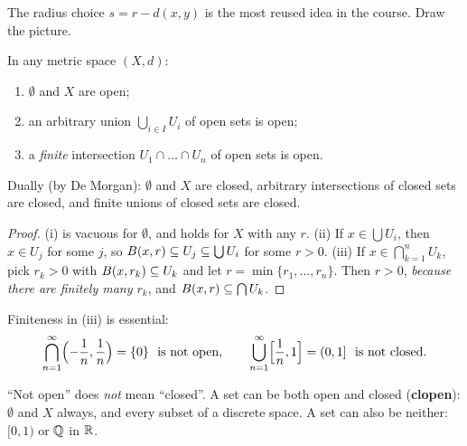 \begin{examtip}
The radius choice $s=r-d(x,y)$ is the most reused idea in the course. Draw the picture.
\end{examtip}

\begin{theorem}\label{thm:openprops}
In any metric space $(X,d)$:
\begin{enumerate}[label=(\roman*)]
  \item $\emptyset$ and $X$ are open;
  \item an arbitrary union $\bigcup_{i\in I}U_i$ of open sets is open;
  \item a \emph{finite} intersection $U_1\cap\dots\cap U_n$ of open sets is open.
\end{enumerate}
Dually (by De Morgan): $\emptyset$ and $X$ are closed, arbitrary intersections of closed sets are closed, and finite unions of closed sets are closed.
\end{theorem}
\begin{proof}
(i) is vacuous for $\emptyset$, and holds for $X$ with any $r$. (ii) If $x\in\bigcup U_i$, then $x\in U_j$ for some $j$, so $B(x,r)\subseteq U_j\subseteq\bigcup U_i$ for some $r>0$. (iii) If $x\in\bigcap_{k=1}^n U_k$, pick $r_k>0$ with $B(x,r_k)\subseteq U_k$ and let $r=\min\{r_1,\dots,r_n\}$. Then $r>0$, \emph{because there are finitely many $r_k$}, and $B(x,r)\subseteq\bigcap U_k$.
\end{proof}

\begin{warning}
Finiteness in (iii) is essential:
\[
  \bigcap_{n=1}^\infty\Bigl(-\frac1n,\frac1n\Bigr)=\{0\}\ \ \text{is not open},
  \qquad
  \bigcup_{n=1}^\infty\Bigl[\frac1n,1\Bigr]=(0,1]\ \ \text{is not closed}.
\]
\end{warning}

\begin{warning}
``Not open'' does \emph{not} mean ``closed''. A set can be both open and closed (\textbf{clopen}): $\emptyset$ and $X$ always, and every subset of a discrete space. A set can also be neither: $[0,1)$ or $\mathbb{Q}$ in $\mathbb{R}$.
\end{warning}

